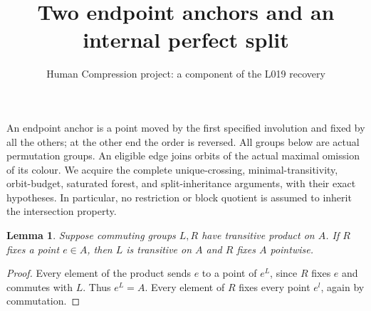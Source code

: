 \documentclass[11pt,a4paper]{article}
\title{Two endpoint anchors and an internal perfect split}
\author{Human Compression project: a component of the L019 recovery}
\date{}
\newtheorem{lemma}{Lemma}
\begin{document}
\maketitle
An endpoint anchor is a point moved by the first specified involution
and fixed by all the others; at the other end the order is reversed.
All groups below are actual permutation groups. An eligible edge joins
orbits of the actual maximal omission of its colour. We acquire the
complete unique-crossing, minimal-transitivity, orbit-budget, saturated
forest, and split-inheritance arguments, with their exact hypotheses.
In particular, no restriction or block quotient is assumed to inherit
the intersection property.

\begin{lemma}\label{fixed}
Suppose commuting groups $L,R$ have transitive product on $A$.
If $R$ fixes a point $e\in A$, then $L$ is transitive on $A$
and $R$ fixes $A$ pointwise.
\end{lemma}
\begin{proof}
Every element of the product sends $e$ to a point of $e^L$,
since $R$ fixes $e$ and commutes with $L$. Thus $e^L=A$.
Every element of $R$ fixes every point $e^l$, again by commutation.
\end{proof}
\end{document}
